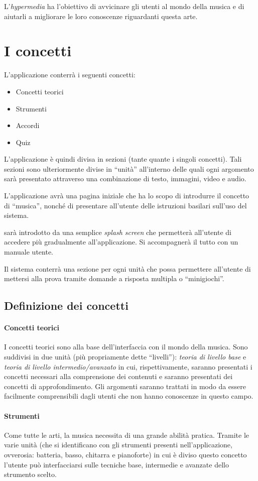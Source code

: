 L'\textit{hypermedia} \ProjectTitle{} ha l'obiettivo di avvicinare gli utenti al mondo della musica e di aiutarli a migliorare le loro conoscenze riguardanti questa arte.
\section{I concetti}
L'applicazione conterrà i seguenti concetti:
\begin{itemize}
	\item Concetti teorici
	\item Strumenti
	\item Accordi
	\item Quiz
\end{itemize}

L'applicazione è quindi divisa in sezioni (tante quante i singoli concetti). Tali sezioni sono ulteriormente divise in ``unità'' all'interno delle quali ogni argomento sarà presentato attraverso una combinazione di testo, immagini, video e audio.

L'applicazione avrà una pagina iniziale che ha lo scopo di introdurre il concetto di ``musica'', nonché di presentare all'utente delle istruzioni basilari sull'uso del sistema.

\ProjectTitle{} sarà introdotto da una semplice \textit{splash screen} che permetterà all'utente di accedere più gradualmente all'applicazione. Si accompagnerà il tutto con un manuale utente.

Il sistema conterrà una sezione per ogni unità che possa permettere all'utente di mettersi alla prova tramite domande a risposta multipla o ``minigiochi''.
\subsection{Definizione dei concetti}
\paragraph{Concetti teorici} I concetti teorici sono alla base dell'interfaccia con il mondo della musica. Sono suddivisi in due unità (più propriamente dette ``livelli''): \textit{teoria di livello base} e \textit{teoria di livello intermedio/avanzato} in cui, rispettivamente, saranno presentati i concetti necessari alla comprensione dei contenuti e saranno presentati dei concetti di approfondimento. Gli argomenti saranno trattati in modo da essere facilmente comprensibili dagli utenti che non hanno conoscenze in questo campo.
\paragraph{Strumenti} Come tutte le arti, la musica necessita di una grande abilità pratica. Tramite le varie unità (che si identificano con gli strumenti presenti nell'applicazione, ovverosia: batteria, basso, chitarra e pianoforte) in cui è diviso questo concetto l'utente può interfacciarsi sulle tecniche base, intermedie e avanzate dello strumento scelto.
